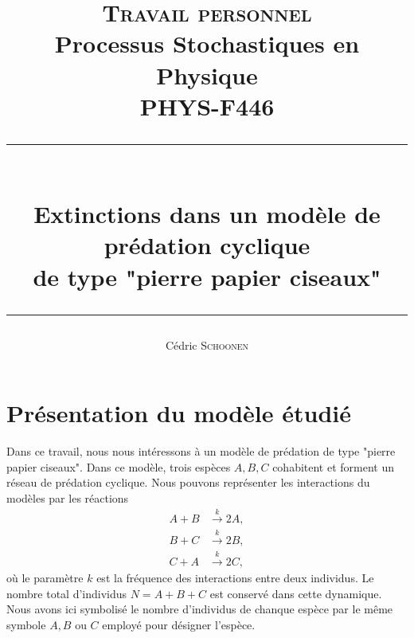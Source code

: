 \documentclass[openany,a4paper,12pt]{article}
\title{
\textsc{Travail personnel}\\ 
Processus Stochastiques en Physique\\
PHYS-F446\\
\rule{\linewidth}{1pt} \\
\vspace{3mm}
Extinctions dans un modèle de prédation cyclique \\
de type "pierre papier ciseaux"\\
\rule{\linewidth}{1pt}
}
\author{Cédric \textsc{Schoonen}}
\begin{document}
\maketitle
\vspace{1cm}

\tableofcontents

\newpage





\section{Présentation du modèle étudié}

\par Dans ce travail, nous nous intéressons à un modèle de prédation de type "pierre papier ciseaux". Dans ce modèle, trois espèces $A,B,C$ cohabitent et forment un réseau de prédation cyclique. Nous pouvons représenter les interactions du modèles par les réactions
%
\begin{equation}\label{reactions_k}
\begin{split}
	A + B & \overset{k}{\longrightarrow} 2A, \\
	B + C & \overset{k}{\longrightarrow} 2B, \\
	C + A & \overset{k}{\longrightarrow} 2C, 
\end{split}
\end{equation}
%
où le paramètre $k$ est la fréquence des interactions entre deux individus. Le nombre total d'individus $N=A+B+C$ est conservé dans cette dynamique. Nous avons ici symbolisé le nombre d'individus de chanque espèce par le même symbole $A,B$ ou $C$ employé pour désigner l'espèce.
\end{document}
